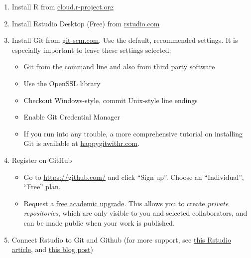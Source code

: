 \documentclass[
]{book}
\providecommand{\tightlist}{%
  \setlength{\itemsep}{0pt}\setlength{\parskip}{0pt}}
\begin{document}
\begin{enumerate}
\def\labelenumi{\arabic{enumi}.}
\tightlist
\item
  Install R from \href{https://cloud.r-project.org/}{cloud.r-project.org}
\item
  Install Rstudio Desktop (Free) from \href{https://rstudio.com/products/rstudio/download/\#download}{rstudio.com}
\item
  Install Git from \href{https://git-scm.com/downloads}{git-scm.com}. Use the default, recommended settings. It is especially important to leave these settings selected:

  \begin{itemize}
  \tightlist
  \item
    Git from the command line and also from third party software\\
  \item
    Use the OpenSSL library\\
  \item
    Checkout Windows-style, commit Unix-style line endings\\
  \item
    Enable Git Credential Manager\\
  \item
    If you run into any trouble, a more comprehensive tutorial on installing Git is available at \href{https://happygitwithr.com/install-git.html}{happygitwithr.com}.
  \end{itemize}
\item
  Register on GitHub

  \begin{itemize}
  \tightlist
  \item
    Go to \url{https://github.com/} and click ``Sign up''. Choose an ``Individual'', ``Free'' plan.
  \item
    Request a \href{https://help.github.com/en/articles/applying-for-an-educator-or-researcher-discount}{free academic upgrade}. This allows you to create \emph{private repositories}, which are only visible to you and selected collaborators, and can be made public when your work is published.
  \end{itemize}
\item
  Connect Rstudio to Git and Github (for more support, see \href{https://support.rstudio.com/hc/en-us/articles/200532077-Version-Control-with-Git-and-SVN}{this Rstudio article}, and \href{https://www.r-bloggers.com/rstudio-and-github/}{this blog post})


\end{enumerate}
\end{document}
